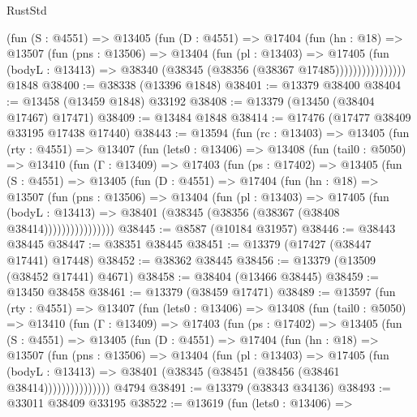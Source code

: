 \begin{lexlean}{RustStd}
\begin{coremodule}
                  (fun (S : @4551) =>
                  @13405
                    (fun (D : @4551) =>
                    @17404
                      (fun (hn : @18) =>
                      @13507
                        (fun (pns : @13506) =>
                        @13404
                          (fun (pl : @13403) =>
                          @17405
                            (fun (bodyL : @13413) =>
                            @38340 (@38345 (@38356 (@38367 @17485))))))))))))))))
    @1848
@38400 := @38338 (@13396 @1848)
@38401 := @13379 @38400
@38404 := @13458 (@13459 @1848) @33192
@38408 := @13379 (@13450 (@38404 @17467) @17471)
@38409 := @13484 @1848
@38414 := @17476 (@17477 @38409 @33195 @17438 @17440)
@38443 := @13594
    (fun (rc : @13403) =>
    @13405
      (fun (rty : @4551) =>
      @13407
        (fun (lets0 : @13406) =>
        @13408
          (fun (tail0 : @5050) =>
          @13410
            (fun (Γ : @13409) =>
            @17403
              (fun (ps : @17402) =>
              @13405
                (fun (S : @4551) =>
                @13405
                  (fun (D : @4551) =>
                  @17404
                    (fun (hn : @18) =>
                    @13507
                      (fun (pns : @13506) =>
                      @13404
                        (fun (pl : @13403) =>
                        @17405
                          (fun (bodyL : @13413) =>
                          @38401 (@38345 (@38356 (@38367 (@38408 @38414))))))))))))))))
@38445 := @8587 (@10184 @31957)
@38446 := @38443 @38445
@38447 := @38351 @38445
@38451 := @13379 (@17427 (@38447 @17441) @17448)
@38452 := @38362 @38445
@38456 := @13379 (@13509 (@38452 @17441) @4671)
@38458 := @38404 (@13466 @38445)
@38459 := @13450 @38458
@38461 := @13379 (@38459 @17471)
@38489 := @13597
    (fun (rty : @4551) =>
    @13407
      (fun (lets0 : @13406) =>
      @13408
        (fun (tail0 : @5050) =>
        @13410
          (fun (Γ : @13409) =>
          @17403
            (fun (ps : @17402) =>
            @13405
              (fun (S : @4551) =>
              @13405
                (fun (D : @4551) =>
                @17404
                  (fun (hn : @18) =>
                  @13507
                    (fun (pns : @13506) =>
                    @13404
                      (fun (pl : @13403) =>
                      @17405
                        (fun (bodyL : @13413) =>
                        @38401 (@38345 (@38451 (@38456 (@38461 @38414)))))))))))))))
    @4794
@38491 := @13379 (@38343 @34136)
@38493 := @33011 @38409 @33195
@38522 := @13619
    (fun (lets0 : @13406) =>

\end{coremodule}
\end{lexlean}
